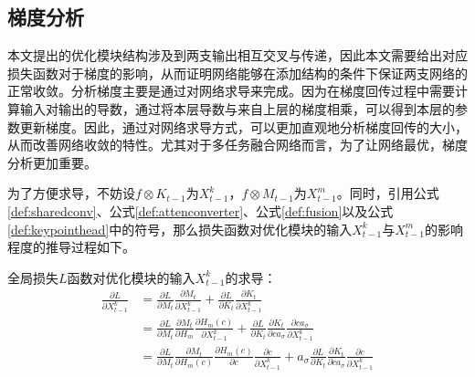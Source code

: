 \subsection{梯度分析}
\label{subsec:gradient}
本文提出的优化模块结构涉及到两支输出相互交叉与传递，因此本文需要给出对应损失函数对于梯度的影响，从而证明网络能够在添加结构的条件下保证两支网络的正常收敛。分析梯度主要是通过对网络求导来完成。因为在梯度回传过程中需要计算输入对输出的导数，通过将本层导数与来自上层的梯度相乘，可以得到本层的参数更新梯度。因此，通过对网络求导方式，可以更加直观地分析梯度回传的大小，从而改善网络收敛的特性。尤其对于多任务融合网络而言，为了让网络最优，梯度分析更加重要。

为了方便求导，不妨设$f \otimes K_{t-1}$为$X^k_{t-1}$，$f \otimes M_{t-1}$为$X^m_{t-1}$。同时，引用公式\eqref{def:sharedconv}、公式\eqref{def:attenconverter}、公式\eqref{def:fusion}以及公式\eqref{def:keypointhead}中的符号，那么损失函数对优化模块的输入$X^k_{t-1}$与$X^m_{t-1}$的影响程度的推导过程如下。
\begin{corollary}
\label{corollary:loss2xk}
全局损失$L$函数对优化模块的输入$X^k_{t-1}$的求导：
\begin{equation*}
\begin{aligned}
\frac{\partial L}{\partial X_{t-1}^k} &= \frac{\partial L}{\partial M_t}\frac{\partial M_t}{\partial X_{t-1}^k} + \frac{\partial L}{\partial K_t}\frac{\partial K_t}{\partial X_{t-1}^k}\\
&= \frac{\partial L}{\partial M_t}\frac{\partial M_t}{\partial H_m}\frac{\partial H_m(c)}{\partial X_{t-1}^k} + \frac{\partial L}{\partial K_t}\frac{\partial K_t}{\partial ca_{\sigma}}\frac{\partial ca_{\sigma}}{\partial X_{t-1}^k}\\
&= \frac{\partial L}{\partial M_t}\frac{\partial M_t}{\partial H_m(c)}\frac{\partial H_m(c)}{\partial c}\frac{\partial c}{\partial X_{t-1}^k} + a_{\sigma}\frac{\partial L}{\partial K_t}\frac{\partial K_t}{\partial ca_{\sigma}}\frac{\partial c}{\partial X_{t-1}^k}
\end{aligned}
\end{equation*}
\end{corollary}
